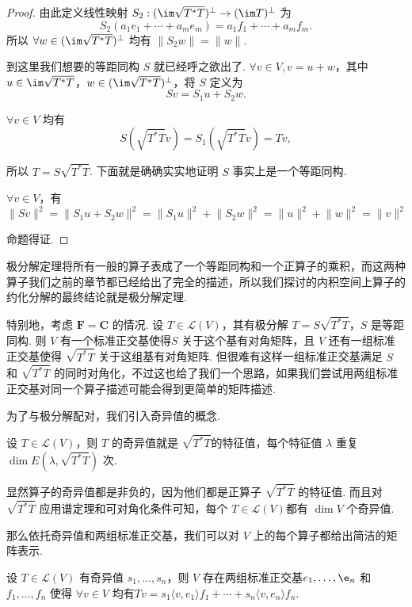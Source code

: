 \begin{proof}
    由此定义线性映射 $ S_2: (\im \sqrt{T^*T})^{\perp} \rightarrow (\im T)^{\perp} $ 为
    \[ S_2(a_1e_1 + \cdots + a_me_m) = a_1f_1 + \cdots + a_mf_m. \]
    所以 $ \forall w \in (\im \sqrt{T^*T})^{\perp} $ 均有 $ \lVert S_2w \rVert = \lVert w \rVert $.

    到这里我们想要的等距同构 $ S $ 就已经呼之欲出了. $ \forall v \in V, v = u + w $，其中 $ u \in \im \sqrt{T^*T} $，$ w \in (\im \sqrt{T^*T})^{\perp} $，将 $ S $ 定义为
    \[ Sv = S_1u + S_2w. \]

    $ \forall v \in V $ 均有
    \[ S(\sqrt{T^*T}v) = S_1(\sqrt{T^*T}v) = Tv, \]

    所以 $ T = S\sqrt{T^*T} $. 下面就是确确实实地证明 $ S $ 事实上是一个等距同构.

    $ \forall v \in V $，有
    \[ \lVert Sv \rVert^2 = \lVert S_1u + S_2w \rVert^2     = \lVert S_1u \rVert^2 + \lVert S_2w \rVert^2 = \lVert u \rVert^2 + \lVert w \rVert^2 = \lVert v \rVert^2 \]

    命题得证.
\end{proof}

极分解定理将所有一般的算子表成了一个等距同构和一个正算子的乘积，而这两种算子我们之前的章节都已经给出了完全的描述，所以我们探讨的内积空间上算子的约化分解的最终结论就是极分解定理.

特别地，考虑 $ \mathbf{F} = \mathbf{C} $ 的情况. 设 $ T \in \mathcal{L}(V) $，其有极分解 $ T = S\sqrt{T^*T} $，$ S $ 是等距同构. 则 $ V $ 有一个标准正交基使得$ S $ 关于这个基有对角矩阵，且 $ V $ 还有一组标准正交基使得 $ \sqrt{T^*T} $ 关于这组基有对角矩阵. 但很难有这样一组标准正交基满足 $ S $ 和 $ \sqrt{T^*T} $ 的同时对角化，不过这也给了我们一个思路，如果我们尝试用两组标准正交基对同一个算子描述可能会得到更简单的矩阵描述.

为了与极分解配对，我们引入奇异值的概念.

\begin{definition}
    设 $ T \in \mathcal{L}(V) $，则 $ T $ 的奇异值就是 $ \sqrt{T^*T} $的特征值，每个特征值 $ \lambda $ 重复 $ \dim E(\lambda, \sqrt{T^*T}) $ 次.
\end{definition}

显然算子的奇异值都是非负的，因为他们都是正算子 $ \sqrt{T^*T} $ 的特征值. 而且对 $ \sqrt{T^*T} $ 应用谱定理和可对角化条件可知，每个 $ T \in \mathcal{L}(V) $都有 $ \dim V $ 个奇异值.

那么依托奇异值和两组标准正交基，我们可以对 $ V $ 上的每个算子都给出简洁的矩阵表示.

\begin{theorem}
    设 $ T \in \mathcal{L}(V) $ 有奇异值 $ s_1, \ldots , s_n $，则 $ V $ 存在两组标准正交基$ e_1, \ldots, \e_n $ 和 $ f_1, \ldots, f_n $ 使得 $ \forall v \in V $ 均有$ Tv = s_1 \langle v, e_1 \rangle f_1 + \cdots + s_n \langle v, e_n \rangle f_n $.
\end{theorem}

